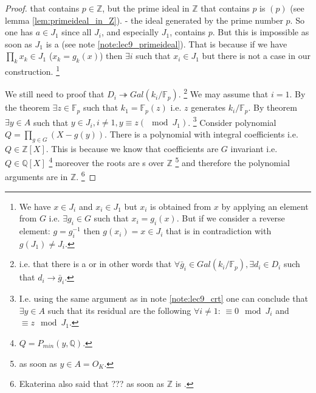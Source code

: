 \begin{theorem}
\begin{proof}
{      that contains $p  
      \in \mathbb{Z}$, but the prime ideal in $\mathbb{Z}$ that
      contains $p$ is $(p)$ (see lemma \ref{lem:primeideal_in_Z}).
      \label{note:lec9_primeideal}
    }
    - the ideal generated by the prime
    number $p$. So one has $a \in J_1$ since all $J_i$, and
    especially $J_1$, contains $p$. But this is impossible as soon as
    $J_1$ is a  (see note
    \ref{note:lec9_primeideal}). That is because if we have 
    $\prod_k x_k \in J_1$ ($x_k = g_k(x)$)
    then $\exists i$ such that $x_i \in J_1$ but
    there is not a case in our construction.
    \footnote{
      We have $x
      \in J_i$ and $x_i \in J_1$ but $x_i$ is obtained from $x$ by
      applying an element from $G$ i.e. $\exists g_i \in G$ such that
      $x_i = g_i(x)$. But if we consider a reverse element: $g =
      g^{-1}_i$ then $g(x_i) = x \in 
      J_i$ that is in contradiction with $g(J_1) \ne J_i$.
    }

    We still need to proof that $D_i \twoheadrightarrow
    Gal\left(k_i/\mathbb{F}_p\right)$.
    \footnote{
      i.e. that there is a
       or in other words that $\forall \bar{g}_i
      \in Gal\left(k_i/\mathbb{F}_p\right), \exists d_i \in D_i$ such that
      $d_i \to \bar{g}_i$.
    }
    We may assume that $i=1$. By the
     theorem $\exists z \in
    \mathbb{F}_p$ such that $k_1 = \mathbb{F}_p\left(z\right)$
    i.e. $z$ generates $k_i/\mathbb{F}_p$.
    By  theorem $\exists y \in A$ such that
    $y \in J_i, i \ne 1,  y \equiv z (\mod J_1)$.
    \footnote{
      I.e. using the same argument as in note \ref{note:lec9_crt} one
      can conclude that $\exists y \in A$ such that its residual are
      the following $\forall i \ne 1$: $\equiv 0 \mod J_i$ and $\equiv z
      \mod J_1$.
    }
    Consider polynomial
    $Q = \prod_{g \in G} \left(X - g\left(y\right)\right)$. There is a
    polynomial with integral coefficients i.e.
    $Q \in \mathbb{Z}\left[X\right]$. This is because we know that
    coefficients are $G$ invariant
    i.e. $Q \in
    \mathbb{Q}\left[X\right]$
    \footnote{
      $Q = P_{min}\left(y, \mathbb{Q}\right)$.
    }
    moreover the roots
    are s over $\mathbb{Z}$
    \footnote{
      as soon as $y \in A = O_K$.
    }
    and therefore the polynomial arguments are in $\mathbb{Z}$.
    \footnote{
      Ekaterina also said that ??? 
      as soon as
      $\mathbb{Z}$ is .
    }


\end{proof}
\end{theorem}
